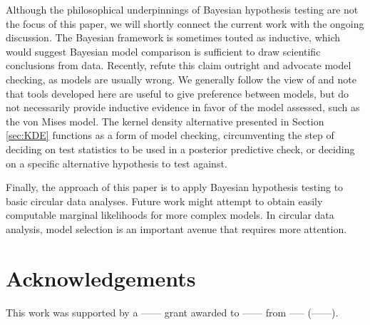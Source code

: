 Although the philosophical underpinnings of Bayesian hypothesis testing are not the focus of this paper, we will shortly connect the current work with the ongoing discussion. The Bayesian framework is sometimes touted as inductive, which would suggest Bayesian model comparison is sufficient to draw scientific conclusions from data. Recently, \citet{gelman2013philosophy} refute this claim outright and advocate model checking, as models are usually wrong. We generally follow the view of \citet{morey2013humble} and note that tools developed here are useful to give preference between models, but do not necessarily provide inductive evidence in favor of the model assessed, such as the von Mises model. The kernel density alternative presented in Section \ref{sec:KDE} functions as a form of model checking, circumventing the step of deciding on test statistics to be used in a posterior predictive check, or deciding on a specific alternative hypothesis to test against.

Finally, the approach of this paper is to apply Bayesian hypothesis testing to basic circular data analyses. Future work might attempt to obtain easily computable marginal likelihoods for more complex models. In circular data analysis, model selection is an important avenue that requires more attention. 

\section{Acknowledgements}

This work was supported by a ------ grant awarded to ------ from ----- (------).


